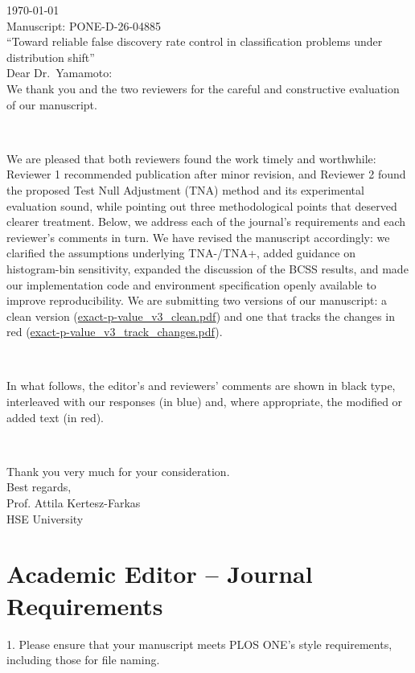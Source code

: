 \documentclass{article}
\begin{document}
\noindent
\today\\[2ex]

\noindent
Manuscript: PONE-D-26-04885\\
``Toward reliable false discovery rate control in classification problems under distribution shift''\\[2ex]

\noindent
Dear Dr.\ Yamamoto:\\[2ex]

We thank you and the two reviewers for the careful and constructive evaluation of our manuscript.

\

We are pleased that both reviewers found the work timely and worthwhile: Reviewer 1 recommended publication after minor revision, and Reviewer 2 found the proposed Test Null Adjustment (TNA) method and its experimental evaluation sound, while pointing out three methodological points that deserved clearer treatment. Below, we address each of the journal's requirements and each reviewer's comments in turn. We have revised the manuscript accordingly: we clarified the assumptions underlying TNA-/TNA+, added guidance on histogram-bin sensitivity, expanded the discussion of the BCSS results, and made our implementation code and environment specification openly available to improve reproducibility. We are submitting two versions of our manuscript: a clean version (\url{exact-p-value_v3_clean.pdf}) and one that tracks the changes in red (\url{exact-p-value_v3_track_changes.pdf}).

\

In what follows, the editor's and reviewers' comments are shown in black type, interleaved with our responses (in blue) and, where appropriate, the modified or added text (in red).

\

Thank you very much for your consideration.\\[2ex]

\noindent
Best regards,\\[2ex]

\noindent
Prof. Attila Kertesz-Farkas\\
HSE University

\clearpage
\section*{Academic Editor -- Journal Requirements}

1. Please ensure that your manuscript meets PLOS ONE's style requirements, including those for file naming.
\end{document}
